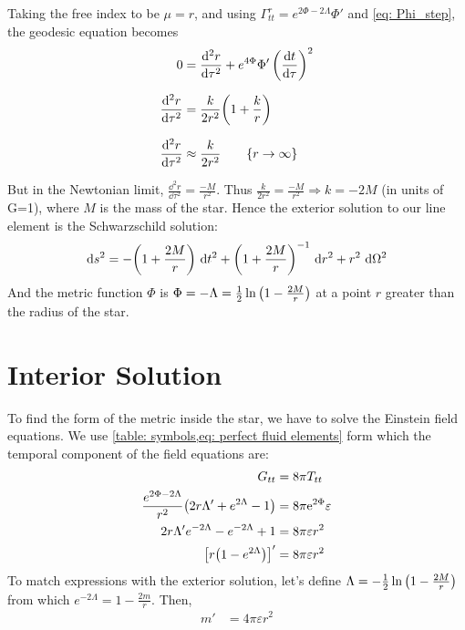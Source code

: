 \documentclass[a4paper,12pt,onehalfspacing]{report}
\begin{document}
Taking the free index to be $\mu= r$, and using $\Gamma ^r_{tt} = e^{2 \Phi-2 \Lambda} \Phi '$ and \cref{eq: Phi_step}, the geodesic equation becomes
\begin{align*}
    0&= \frac{\dd^2 r}{\dd\tau^2}+ e^{4\Phi} \Phi'\left(\frac{\dd t}{\dd\tau}\right)^2 \\[1.5ex]
    \frac{\dd^2 r}{\dd\tau^2}&= \frac{k}{2r^2}\qty(1+\frac{k}{r})\\[1.5ex]
    \frac{\dd^2 r}{\dd\tau^2}&\approx \frac{k}{2r^2}\qquad \qty{r\rightarrow \infty}
\end{align*}

But in the Newtonian limit, $\frac{\dd^2 r}{\dd\tau^2}= \frac{-M}{r^2}$. Thus $\frac{k}{2r^2}= \frac{-M}{r^2}\Rightarrow k=-2M$ (in units of G=1), where $M$ is the mass of the star. Hence the exterior solution to our line element is the Schwarzschild solution: 
\begin{equation}
    \dd s^2 = -\qty(1+\frac{2M}{r})\ \dd t^2+ \qty(1+\frac{2M}{r})^{-1}\ \dd r^2+r^2\ \dd\Omega^2\\
\end{equation}
And the metric function $\Phi$ is $\Phi= -\Lambda= \frac{1}{2}\ln\qty({1-\frac{2M}{r}})$ at a point $r$ greater than the radius of the star. 

\section{Interior Solution}

To find the form of the metric inside the star, we have to solve the Einstein field equations. We use \cref{table: symbols,eq: perfect fluid elements} form which the temporal component of the field equations are:
\begin{align*}
    G_{tt}&= 8\pi T_{tt}\\
    \frac{e^{2 \Phi-2 \Lambda}}{r^2}\qty(2 r \Lambda '+e^{2 \Lambda}-1)&= 8\pi\mathrm{e}^{2\Phi}\varepsilon\\
    2 r \Lambda 'e^{-2 \Lambda }-e^{-2 \Lambda }+1&= 8\pi\varepsilon r^2\\
    \qty[r\qty(1-e^{2 \Lambda})]'&= 8\pi\varepsilon r^2
\end{align*}
To match expressions with the exterior solution, let's define $\Lambda= -\frac{1}{2}\ln\qty({1-\frac{2M}{r}})$ from which $e^{-2\Lambda}= 1- \frac{2m}{r}$. Then,
\begin{align}
    m' &= 4\pi\varepsilon r^2\label{eq: dm}
\end{align}
\end{document}
